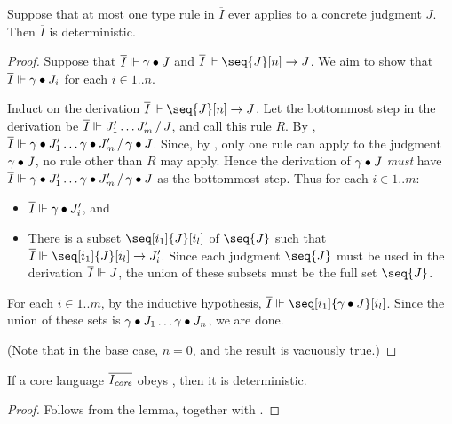 \begin{lemma}[Determinism]
  \label{lemma:rtype-determinism}
  Suppose that at most one type rule in $\overline{I}$ ever applies to a
  concrete judgment $J$.
  Then $\overline{I}$ is deterministic.
\end{lemma}
\begin{proof}
  Suppose that 
  $\overline{I} \Vdash \gamma \bullet J$
  and $\saysVD{\overline{I}}{\seq{J}[n]}{J}$.
  We aim to show that $\overline{I} \Vdash \gamma \bullet J_i$ for each $i \in 1..n$.
  
  Induct on the derivation
  $\saysVD{\overline{I}}{\seq{J}[n]}{J}$.
  Let the bottommost step in the derivation be
  $\overline{I} \Vdash J_1' \dots J_m'\,/\,J$, and call this rule $R$.
  By , \newline
  $\overline{I} \Vdash \gamma \bullet J_1' \dots \gamma \bullet J_m'\,/\,\gamma \bullet J$.
  Since, by , only one rule can apply to the
  judgment $\gamma \bullet J$, no rule other than $R$ may apply.
  Hence the derivation of $\gamma \bullet J$ \emph{must} have
  $\overline{I} \Vdash \gamma \bullet J_1' \dots \gamma \bullet J_m'\,/\,\gamma \bullet J$
  as the bottommost step.
  Thus for each $i \in 1..m$:
  \begin{itemize}
  \item $\overline{I} \Vdash \gamma \bullet J'_i$, and
  \item There is a subset $\seq[i_1]{J}[i_l]$ of
    $\seq{J}$ such that $\saysVD{\overline{I}}{\seq[i_1]{J}[i_l]}{J'_i}$.
    Since each judgment $\seq{J}$ must be used in the derivation
    $\overline{I} \Vdash J$, the union of these subsets must be
    the full set $\seq{J}$.
  \end{itemize}
  For each $i \in 1..m$, by the inductive hypothesis, \newline
  $\saysJ{\overline{I}}{\seq[i_1]{\Subs{\gamma}{J}}[i_l]}$.
  Since the union of these sets is $\gamma \bullet J_1\dots\gamma \bullet J_n$, we are done.

  (Note that in the base case, $n = 0$, and the result is vacuously
  true.)
\end{proof}
\begin{corollary}
  \label{lemma:rtype-core-determinism}
  If a core language $\overline{I_\textit{core}}$ obeys ,
  then it is deterministic.
\end{corollary}
\begin{proof}
  Follows from the lemma, together with .
\end{proof}
  


